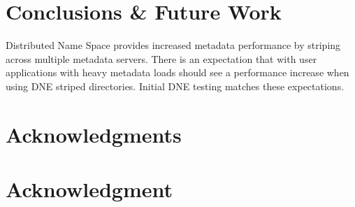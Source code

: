\documentclass[conference,compsoc]{IEEEtran}
\begin{document}





%
%
%
%


\section{Conclusions \& Future Work}

Distributed Name Space provides increased metadata performance by 
striping across multiple metadata servers. There is an expectation
that with user applications with heavy metadata loads should see a
performance increase when using DNE striped directories. Initial
DNE testing matches these expectations.


\ifCLASSOPTIONcompsoc
  \section*{Acknowledgments}
\else
  \section*{Acknowledgment}
\fi
\end{document}
